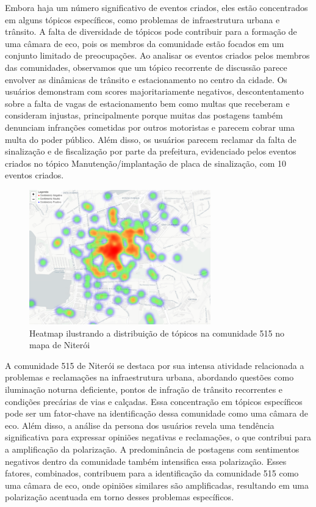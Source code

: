 Embora haja um número significativo de eventos criados, eles estão concentrados em alguns tópicos específicos, como problemas de infraestrutura urbana e trânsito. A falta de diversidade de tópicos pode contribuir para a formação de uma câmara de eco, pois os membros da comunidade estão focados em um conjunto limitado de preocupações. Ao analisar os eventos criados pelos membros das comunidades, observamos que um tópico recorrente de discussão parece envolver as dinâmicas de trânsito e estacionamento no centro da cidade. Os usuários demonstram com scores majoritariamente negativos, descontentamento sobre a falta de vagas de estacionamento bem como multas que receberam e consideram injustas, principalmente porque muitas das postagens também denunciam infranções cometidas por outros motoristas e parecem cobrar uma multa do poder público. Além disso, os usuários parecem reclamar da falta de sinalização e de fiscalização por parte da prefeitura, evidenciado pelos eventos criados no tópico Manutenção/implantação de placa de sinalização, com 10 eventos criados.

\begin{figure}[htb]
	\centering
	\includegraphics[width=0.7\textwidth]{images/echo_chamber_niteroi_heatmap.PNG}
	\caption{Heatmap ilustrando a distribuição de tópicos na comunidade 515 no mapa de Niterói}
	\label{fig:echo_chamber_niteroi_heatmap}
\end{figure}

A comunidade 515 de Niterói se destaca por sua intensa atividade relacionada a problemas e reclamações na infraestrutura urbana, abordando questões como iluminação noturna deficiente, pontos de infração de trânsito recorrentes e condições precárias de vias e calçadas. Essa concentração em tópicos específicos pode ser um fator-chave na identificação dessa comunidade como uma câmara de eco. Além disso, a análise da persona dos usuários revela uma tendência significativa para expressar opiniões negativas e reclamações, o que contribui para a amplificação da polarização. A predominância de postagens com sentimentos negativos dentro da comunidade também intensifica essa polarização. Esses fatores, combinados, contribuem para a identificação da comunidade 515 como uma câmara de eco, onde opiniões similares são amplificadas, resultando em uma polarização acentuada em torno desses problemas específicos.

